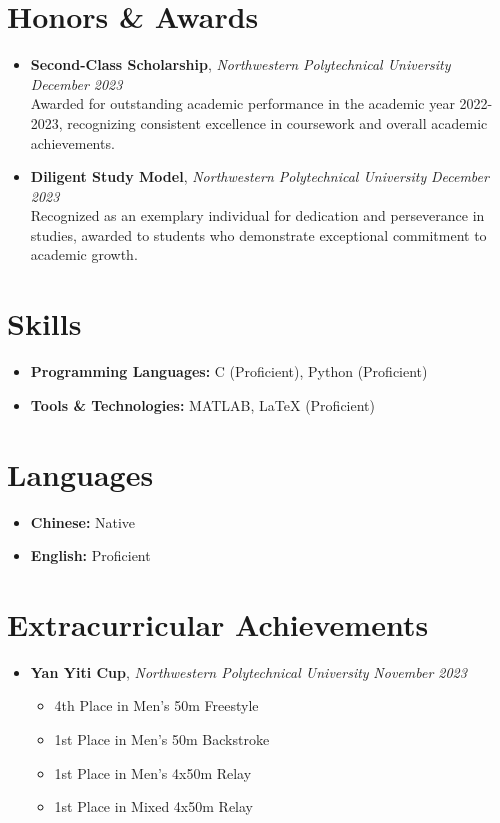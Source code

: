 \documentclass[a4paper,10pt]{article}
\begin{document}
\section*{Honors \& Awards}
\begin{itemize}[leftmargin=0.5cm]
    \item \textbf{Second-Class Scholarship}, \textit{Northwestern Polytechnical University} \hfill \textit{December 2023} \\
    Awarded for outstanding academic performance in the academic year 2022-2023, recognizing consistent excellence in coursework and overall academic achievements.

    \item \textbf{Diligent Study Model}, \textit{Northwestern Polytechnical University} \hfill \textit{December 2023} \\
    Recognized as an exemplary individual for dedication and perseverance in studies, awarded to students who demonstrate exceptional commitment to academic growth.
\end{itemize}

\section*{Skills}
\begin{itemize}[leftmargin=0.5cm]
    \item \textbf{Programming Languages:} C (Proficient), Python (Proficient)
    \item \textbf{Tools \& Technologies:} MATLAB, LaTeX (Proficient)
\end{itemize}

\section*{Languages}
\begin{itemize}[leftmargin=0.5cm]
    \item \textbf{Chinese:} Native
    \item \textbf{English:} Proficient
\end{itemize}

\section*{Extracurricular Achievements}
\begin{itemize}[leftmargin=0.5cm]
    \item \textbf{Yan Yiti Cup}, \textit{Northwestern Polytechnical University} \hfill \textit{November 2023} 
    \begin{itemize}
        \item 4th Place in Men's 50m Freestyle
        \item 1st Place in Men's 50m Backstroke
        \item 1st Place in Men's 4x50m Relay
        \item 1st Place in Mixed 4x50m Relay
    \end{itemize}
\end{itemize}
\end{document}
